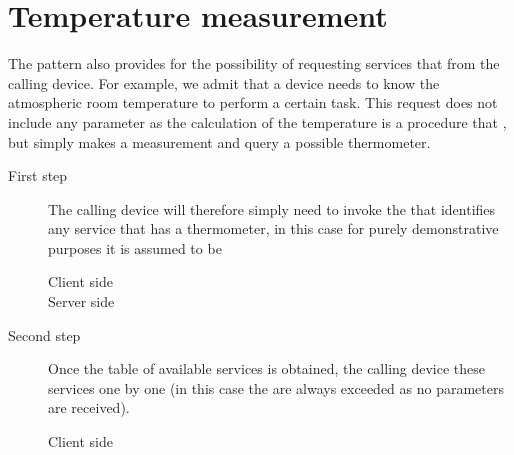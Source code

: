 \documentclass[a4paper,10pt,english,openany,oneside]{sphinxmanual}
\begin{document}
\section{Temperature measurement}
\label{\detokenize{example:temperature-measurement}}
The pattern also provides for the possibility of requesting services that
 from the calling device. For example, we
admit that a device needs to know the atmospheric room temperature to
perform a certain task. This request does not include any parameter
as the calculation of the temperature is a procedure that , but simply makes a measurement and query a
possible thermometer.
\begin{description}
\item[{First step}] \leavevmode
The calling device will therefore simply need to invoke the 
that identifies any service that has a thermometer, in this case
for purely demonstrative purposes it is assumed to be 
\begin{description}
\item[{Client side}] \leavevmode
\begin{sphinxVerbatim}[commandchars=\\\{\}]
\PYG{p}{[}\PYG{p}{]}\PYG{p}{[}\PYG{p}{]}
\end{sphinxVerbatim}

\item[{Server side}] \leavevmode
\begin{sphinxVerbatim}[commandchars=\\\{\}]
  
\end{sphinxVerbatim}

\end{description}

\item[{Second step}] \leavevmode
Once the table of available services is obtained, the calling device
 these services one by one (in this case the 
are always exceeded as no parameters are received).
\begin{description}
\item[{Client side}] \leavevmode
\begin{sphinxVerbatim}[commandchars=\\\{\}]
  
\end{sphinxVerbatim}


\end{description}
\end{description}
\end{document}
